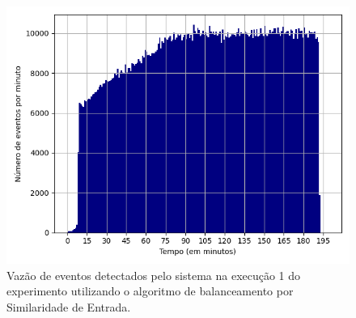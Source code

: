 



\begin{figure}[h]
\centering
\includegraphics[width=\textwidth]{figuras/graphics/histogram_vazao_6-dez-is.png}
\caption{Vazão de eventos detectados pelo sistema na execução 1 do experimento utilizando o algoritmo de balanceamento por Similaridade de Entrada.}
\label{fig:vazao_6-dez-is}
\end{figure}



